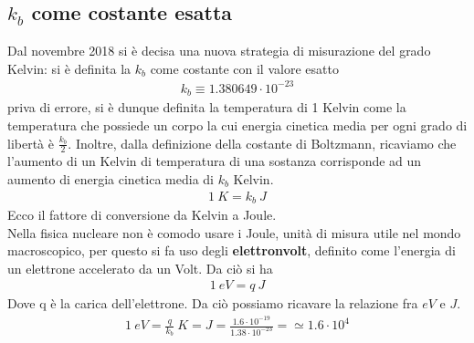 \documentclass[10pt,a4paper]{article}
\begin{document}
\subsection{$k_b$ come costante esatta}
Dal novembre 2018 si è decisa una nuova strategia di misurazione del grado Kelvin: si è definita la $k_b$ come costante con il valore esatto
\begin{align*} 
	k_b \equiv 1.380649 \cdot 10^{-23}
\end{align*} 
priva di errore, si è dunque definita la temperatura di 1 Kelvin come la temperatura che possiede un corpo la cui energia cinetica media per ogni grado di libertà è $\frac{k_b}{2}$. Inoltre, dalla definizione della costante di Boltzmann, ricaviamo che l'aumento di un Kelvin di temperatura di una sostanza corrisponde ad un aumento di energia cinetica media di $k_b$ Kelvin. 
\begin{align*} 
	1\ K = k_b\ J
\end{align*}  
Ecco il fattore di conversione da Kelvin a Joule.\\
Nella fisica nucleare non è comodo usare i Joule, unità di misura utile nel mondo macroscopico, per questo si fa uso degli \textbf{elettronvolt}, definito come l'energia di un elettrone accelerato da un Volt. Da ciò si ha 
\begin{align*} 
	1\ eV = q\ J
\end{align*} 
Dove q è la carica dell'elettrone. Da ciò possiamo ricavare la relazione fra $eV$ e $J$.
\begin{align*} 
	1\ eV = \frac{q}{k_b}\ K = J = \frac{1.6\cdot 10^{-19}}{1.38\cdot10^{-23}}=\simeq 1.6 \cdot 10^4
\end{align*} 
\end{document}
